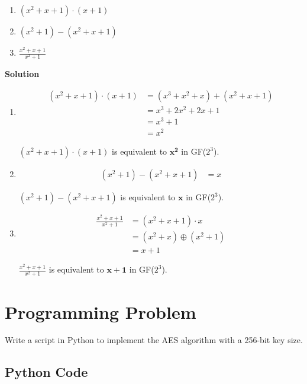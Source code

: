 \documentclass[11pt]{article}
\begin{document}
\begin{enumerate}[label=(\alph*)]
\item $(x^2+x+1) \cdot (x + 1)$
\item $(x^2 + 1) - (x^2 + x + 1)$
\item $\displaystyle{\frac{x^2 + x + 1}{x^2 + 1}}$
\end{enumerate}

\textbf{Solution}

\begin{enumerate}[label=(\alph*)]
\item
\[
	\begin{split}
		(x^2+x+1) \cdot (x + 1) &= (x^3 + x^2 + x) + (x^2 + x + 1)
		\\
		&= x^3 + 2x^2 + 2x + 1
		\\
		&= x^3 + 1
		\\
		&= x^2
	\end{split}
\]

$(x^2+x+1) \cdot (x + 1)$ is equivalent to $\mathbf{x^2}$ in GF($2^3$).

\item
\[
	\begin{split}
		(x^2 + 1) - (x^2 + x + 1) &= x
	\end{split}
\]

$(x^2 + 1) - (x^2 + x + 1)$ is equivalent to $\mathbf{x}$ in GF($2^3$).

\item
\[
	\begin{split}
		\displaystyle{\frac{x^2 + x + 1}{x^2 + 1}} &= (x^2 + x + 1) \cdot x
		\\
		&= (x^2 + x) \oplus (x^2 + 1)
		\\
		&= x + 1
	\end{split}
\]

$\displaystyle{\frac{x^2 + x + 1}{x^2 + 1}}$ is equivalent to $\mathbf{x + 1}$ in GF($2^3$).

\end{enumerate}

\pagebreak


\section{Programming Problem}

Write a script in Python to implement the AES algorithm with a 256-bit key size. 

\subsection{Python Code}

\pagebreak
\end{document}
